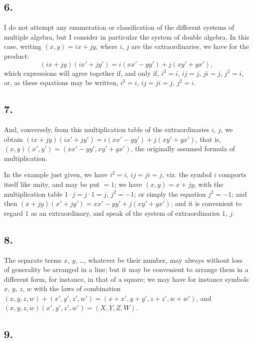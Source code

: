 \documentclass[11pt,a4paper]{article}
\theoremstyle{definition}
\begin{document}
\subsection*{6.}

I do not attempt any enumeration or classification of the different systems of multiple algebra, but I consider in particular the system of double algebra. In this case, writing $(x, y) = ix + jy$, where $i$, $j$ are the extraordinaries, we have for the product:
\[
(ix + jy)(ix' + jy') = i(xx' - yy') + j(xy' + yx'),
\]
which expressions will agree together if, and only if, $i^2 = i$, $ij = j$, $ji = j$, $j^2 = i$, or, as these equations may be written, $i^2 = i$, $ij = ji = j$, $j^2 = i$.

\subsection*{7.}

And, conversely, from this multiplication table of the extraordinaries $i$, $j$, we obtain $(ix + jy)(ix' + jy') = i(xx' - yy') + j(xy' + yx')$, that is, $(x, y)(x', y') = (xx' - yy', xy' + yx')$, the originally assumed formula of multiplication.

In the example just given, we have $i^2 = i$, $ij = ji = j$, viz. the symbol $i$ comports itself like unity, and may be put $= 1$; we have $(x, y) = x + jy$, with the multiplication table $1 \cdot j = j \cdot 1 = j$, $j^2 = -1$; or simply the equation $j^2 = -1$; and then $(x + jy)(x' + jy') = xx' - yy' + j(xy' + yx')$; and it is convenient to regard $1$ as an extraordinary, and speak of the system of extraordinaries $1$, $j$.

\subsection*{8.}

The separate terms $x$, $y$, \ldots, whatever be their number, may always without loss of generality be arranged in a line; but it may be convenient to arrange them in a different form, for instance, in that of a square; we may have for instance symbols $x$, $y$, $z$, $w$ with the laws of combination $(x, y, z, w) + (x', y', z', w') = (x + x', y + y', z + z', w + w')$, and $(x, y, z, w)(x', y', z', w') = (X, Y, Z, W)$.

\subsection*{9.}
\end{document}
